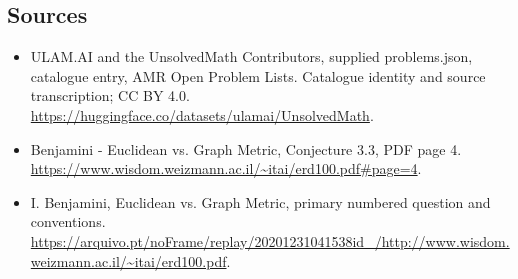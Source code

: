 \documentclass[11pt,a4paper]{article}
\begin{document}
\subsection{Sources}
\begin{itemize}
\item[S1] ULAM.AI and the UnsolvedMath Contributors, supplied problems.json, catalogue entry, AMR Open Problem Lists. Catalogue identity and source transcription; CC BY 4.0.
\url{https://huggingface.co/datasets/ulamai/UnsolvedMath}.
\item[S2] Benjamini - Euclidean vs. Graph Metric, Conjecture 3.3, PDF page 4. 
\url{https://www.wisdom.weizmann.ac.il/~itai/erd100.pdf#page=4}.
\item[S3] I. Benjamini, Euclidean vs. Graph Metric, primary numbered question and conventions.
\url{https://arquivo.pt/noFrame/replay/20201231041538id_/http://www.wisdom.weizmann.ac.il/~itai/erd100.pdf}.
\end{itemize}
\end{document}
